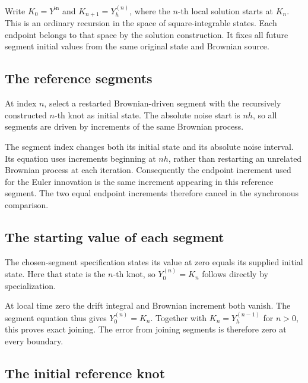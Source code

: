 \documentclass[11pt,a4paper]{report}
\begin{document}
Write \(K_0=Y^{\mathrm{in}}\) and \(K_{n+1}=Y^{(n)}_h\), where the \(n\)-th local solution starts at \(K_n\). This is an ordinary recursion in the space of square-integrable states. Each endpoint belongs to that space by the solution construction. It fixes all future segment initial values from the same original state and Brownian source.

\subsection{\texorpdfstring{The reference segments}{The reference segments}}
\label{report-step-UnadjustedLangevin-BrownianReference-lean-4}


At index \(n\), select a restarted Brownian-driven segment with the recursively constructed \(n\)-th knot as initial state. The absolute noise start is \(nh\), so all segments are driven by increments of the same Brownian process.



The segment index changes both its initial state and its absolute noise interval. Its equation uses increments beginning at \(nh\), rather than restarting an unrelated Brownian process at each iteration. Consequently the endpoint increment used for the Euler innovation is the same increment appearing in this reference segment. The two equal endpoint increments therefore cancel in the synchronous comparison.

\subsection{\texorpdfstring{The starting value of each segment}{The starting value of each segment}}
\label{report-step-UnadjustedLangevin-BrownianReference-lean-5}


The chosen-segment specification states its value at zero equals its supplied initial state. Here that state is the \(n\)-th knot, so \(Y^{(n)}_0=K_n\) follows directly by specialization.



At local time zero the drift integral and Brownian increment both vanish. The segment equation thus gives \(Y^{(n)}_0=K_n\). Together with \(K_n=Y^{(n-1)}_h\) for \(n>0\), this proves exact joining. The error from joining segments is therefore zero at every boundary.

\subsection{\texorpdfstring{The initial reference knot}{The initial reference knot}}
\label{report-step-UnadjustedLangevin-BrownianReference-lean-6}
\end{document}
